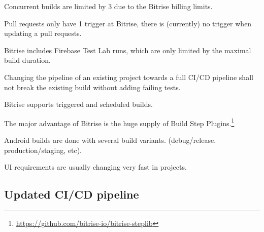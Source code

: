 \begin{statement}
	Concurrent builds are limited by 3 due to the Bitrise billing limits.
\end{statement}

\begin{statement}
	Pull requests only have 1 trigger at Bitrise, there is (currently) no trigger when updating a pull requests.
\end{statement}

\begin{statement}
	Bitrise includes Firebase Test Lab runs, which are only limited by the maximal build duration.
\end{statement}

\begin{statement}\label{stat:break_builds}
	Changing the pipeline of an existing project towards a full CI/CD pipeline shall not break the existing build without adding failing tests.
\end{statement}

\begin{statement}
	Bitrise supports triggered and scheduled builds.
\end{statement}

\begin{statement}
	The major advantage of Bitrise is the huge supply of Build Step Plugins.\footnote{\url{https://github.com/bitrise-io/bitrise-steplib}}
\end{statement}

\begin{statement}
	Android builds are done with several build variants. (debug/release, production/staging, etc).
\end{statement}

\begin{statement}
	UI requirements are usually changing very fast in projects.
\end{statement}

\subsection{Updated CI/CD pipeline}


